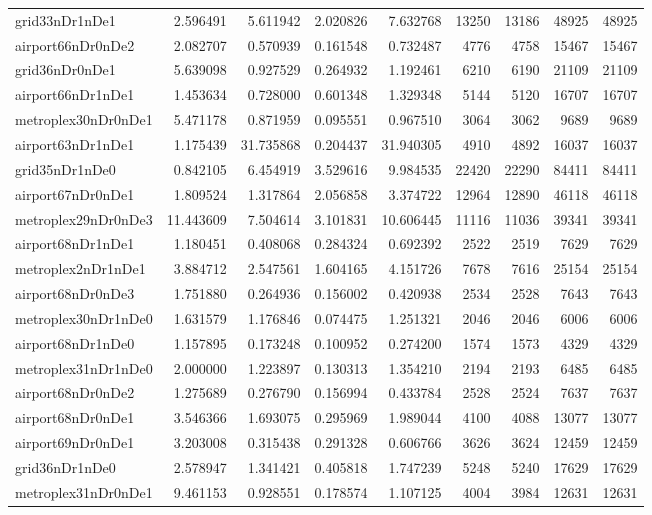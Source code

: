 \begin{longtable}{|l|r|r|r|r|r|r|r|r|}
grid33nDr1nDe1 & 2.596491 & 5.611942 & 2.020826 & 7.632768 & 13250 & 13186 & 48925 & 48925 \\
airport66nDr0nDe2 & 2.082707 & 0.570939 & 0.161548 & 0.732487 & 4776 & 4758 & 15467 & 15467 \\
grid36nDr0nDe1 & 5.639098 & 0.927529 & 0.264932 & 1.192461 & 6210 & 6190 & 21109 & 21109 \\
airport66nDr1nDe1 & 1.453634 & 0.728000 & 0.601348 & 1.329348 & 5144 & 5120 & 16707 & 16707 \\
metroplex30nDr0nDe1 & 5.471178 & 0.871959 & 0.095551 & 0.967510 & 3064 & 3062 & 9689 & 9689 \\
airport63nDr1nDe1 & 1.175439 & 31.735868 & 0.204437 & 31.940305 & 4910 & 4892 & 16037 & 16037 \\
grid35nDr1nDe0 & 0.842105 & 6.454919 & 3.529616 & 9.984535 & 22420 & 22290 & 84411 & 84411 \\
airport67nDr0nDe1 & 1.809524 & 1.317864 & 2.056858 & 3.374722 & 12964 & 12890 & 46118 & 46118 \\
metroplex29nDr0nDe3 & 11.443609 & 7.504614 & 3.101831 & 10.606445 & 11116 & 11036 & 39341 & 39341 \\
airport68nDr1nDe1 & 1.180451 & 0.408068 & 0.284324 & 0.692392 & 2522 & 2519 & 7629 & 7629 \\
metroplex2nDr1nDe1 & 3.884712 & 2.547561 & 1.604165 & 4.151726 & 7678 & 7616 & 25154 & 25154 \\
airport68nDr0nDe3 & 1.751880 & 0.264936 & 0.156002 & 0.420938 & 2534 & 2528 & 7643 & 7643 \\
metroplex30nDr1nDe0 & 1.631579 & 1.176846 & 0.074475 & 1.251321 & 2046 & 2046 & 6006 & 6006 \\
airport68nDr1nDe0 & 1.157895 & 0.173248 & 0.100952 & 0.274200 & 1574 & 1573 & 4329 & 4329 \\
metroplex31nDr1nDe0 & 2.000000 & 1.223897 & 0.130313 & 1.354210 & 2194 & 2193 & 6485 & 6485 \\
airport68nDr0nDe2 & 1.275689 & 0.276790 & 0.156994 & 0.433784 & 2528 & 2524 & 7637 & 7637 \\
airport68nDr0nDe1 & 3.546366 & 1.693075 & 0.295969 & 1.989044 & 4100 & 4088 & 13077 & 13077 \\
airport69nDr0nDe1 & 3.203008 & 0.315438 & 0.291328 & 0.606766 & 3626 & 3624 & 12459 & 12459 \\
grid36nDr1nDe0 & 2.578947 & 1.341421 & 0.405818 & 1.747239 & 5248 & 5240 & 17629 & 17629 \\
metroplex31nDr0nDe1 & 9.461153 & 0.928551 & 0.178574 & 1.107125 & 4004 & 3984 & 12631 & 12631 \\

\end{longtable}
